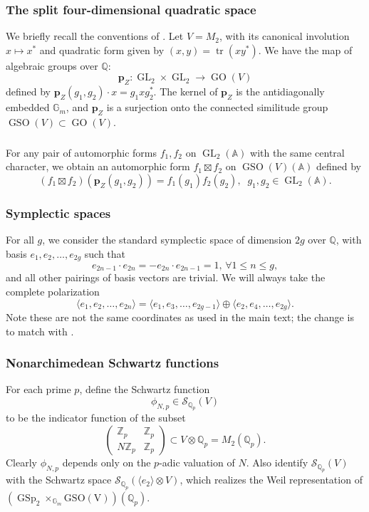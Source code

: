 \documentclass[12pt]{amsart}
\def\bA{\mathbb{A}}
\theoremstyle{definition}
\newcommand{\Z}{\mathbb{Z}}
\newcommand{\Q}{\mathbb{Q}}
\DeclareMathOperator{\GL}{GL}
\DeclareMathOperator{\GSp}{GSp}
\begin{document}
\subsubsection{The split four-dimensional quadratic space}
We briefly recall the conventions of \cite[\S5.1]{sweeting2022tateclassesendoscopyoperatornamegsp4}. 
Let $V = M_2$, with its canonical involution $x \mapsto x^\ast$ and quadratic form given by $(x, y) = \operatorname{tr}(xy^\ast).$ We have the map of algebraic groups over $\Q$:
\begin{equation}
    \boldsymbol{p}_Z: \GL_2 \times \GL_2 \to \operatorname{GO}(V)
\end{equation}
defined by $\boldsymbol{p}_Z(g_1, g_2) \cdot x = g_1 x g_2^\ast$. The kernel of $\boldsymbol{p}_Z$ is the antidiagonally embedded $\mathbb G_m$, and $\boldsymbol{p}_Z$ is a surjection onto the connected similitude group $\operatorname{GSO}(V) \subset \operatorname{GO}(V)$.

\subsubsection{}For any pair of automorphic forms $f_1,f_2$ on $\GL_2(\bA)$ with the same central character, we obtain an automorphic form $f_1\boxtimes f_2$ on $\operatorname{GSO}(V)(\bA)$ defined by \begin{equation}
    (f_1\boxtimes f_2)(\boldsymbol{p}_Z(g_1,g_2)) = f_1(g_1)f_2(g_2),\;\; g_1,g_2\in \GL_2(\bA).
\end{equation}
\subsubsection{Symplectic spaces}
For all $g$, we consider the standard symplectic space of dimension $2g$ over $\Q$, with basis $e_1,e_2,\ldots, e_{2g}$ such that
$$ e_{2n-1}\cdot e_{2n} = -e_{2n}\cdot e_{2n-1} = 1,\, \forall 1\leq n \leq g,$$ and all other pairings of basis vectors are trivial. We will always take the complete polarization $$\langle e_1, e_2, \ldots, e_{2n} \rangle =  \langle e_1,e_3,\ldots, e_{2g-1}\rangle\oplus  \langle e_2,e_4,\ldots, e_{2g}\rangle.$$
Note these are not the same coordinates as used in the main text; the change is to match with \cite{sweeting2022tateclassesendoscopyoperatornamegsp4}.

\subsubsection{Nonarchimedean Schwartz functions}
For each prime $p$, define the Schwartz function $$\phi_{N,p} \in \mathcal S_{\Q_p} (V)$$ to be the indicator function of the subset $$\begin{pmatrix}
    \Z_p & \Z_p \\ N\Z_p & \Z_p 
\end{pmatrix}\subset V\otimes \Q_p = M_2(\Q_p).$$
Clearly $\phi_{N,p}$ depends only on the $p$-adic valuation of $N$.
Also identify  $\mathcal S_{\Q_p} (V)$ with the Schwartz space $\mathcal S_{\Q_p} (\langle e_2\rangle\otimes V)$, which realizes the Weil representation of $(\GSp_2\times_{\mathbb G_m} \operatorname{GSO(V)})(\Q_p)$.
\end{document}
